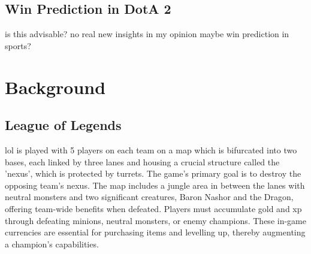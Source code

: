 \documentclass[12pt, a4paper, headinclude, twoside, plainheadsepline, open=right, numbers=noenddot, hidelinks, toc=listof, toc=bibliography]{scrreprt}
\begin{document}
\section{Win Prediction in DotA 2}
is this advisable? no real new insights in my opinion
maybe win prediction in sports?
%


%
%
%

\chapter{Background}
\label{chap:background}

\section{League of Legends}
\label{sec:LoL}

\Ac{lol} is played with 5 players on each team on a map which is bifurcated into two bases, each linked by three lanes and housing a crucial structure called the 'nexus', which is protected by turrets. 
The game's primary goal is to destroy the opposing team's nexus.
The map includes a jungle area in between the lanes with neutral monsters and two significant creatures, Baron Nashor and the Dragon, offering team-wide benefits when defeated.
Players must accumulate gold and \ac{xp} through defeating minions, neutral monsters, or enemy champions. 
These in-game currencies are essential for purchasing items and levelling up, thereby augmenting a champion's capabilities.
\end{document}
